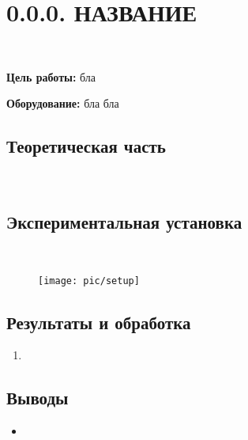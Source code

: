 \documentclass[12pt]{article}
\begin{document}
    \section*{0.0.0. НАЗВАНИЕ}
    \ \par
    \textbf{Цель работы:} бла

    \textbf{Оборудование:} бла бла

    \subsection*{Теоретическая часть}
    \ \par


    \subsection*{Экспериментальная установка}
    \ \par


    \begin{figure}[h]
        \centering
        \texttt{[image: pic/setup]}
        \caption{}
        \label{fig:fig1}
    \end{figure}



    \subsection*{Результаты и обработка}
    \begin{enumerate}
        \item
    \end{enumerate}

    \subsection*{Выводы}
    \begin{itemize}
        \item
    \end{itemize}
\end{document}
